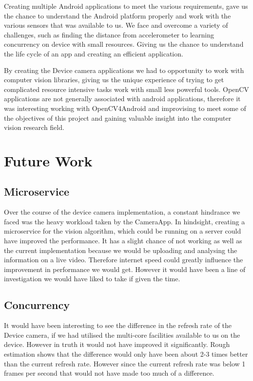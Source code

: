 Creating multiple Android applications to meet the various requirements, gave us the chance to understand the Android platform properly and work with the various sensors that was available to us. We face and overcome a variety of challenges, such as finding the distance from accelerometer to learning concurrency on device with small resources. Giving us the chance to understand the life cycle of an app and creating an efficient application.

By creating the Device camera applications we had to opportunity to work with computer vision libraries, giving us the unique experience of trying to get complicated resource intensive tasks work with small less powerful tools. OpenCV applications are not generally associated with android applications, therefore it was interesting working with OpenCV4Android and improvising to meet some of the objectives of this project and gaining valuable insight into the computer vision research field.

\section{Future Work}

\subsection{Microservice}
Over the course of the device camera implementation, a constant hindrance we faced was the heavy workload taken by the CameraApp. In hindsight, creating a microservice for the vision algorithm, which could be running on a server could have improved the performance. It has a slight chance of not working as well as the current implementation because we would be uploading and analysing the information on a live video. Therefore internet speed could greatly influence the improvement in performance we would get. However it would have been a line of investigation we would have liked to take if given the time.

\subsection{Concurrency}
It would have been interesting to see the difference in the refresh rate of the Device camera, if we had utilised the multi-core facilities available to us on the device. However in truth it would not have improved it significantly. Rough estimation shows that the difference would only have been about 2-3 times better than the current refresh rate. However since the current refresh rate was below 1 frames per second that would not have made too much of a difference.

